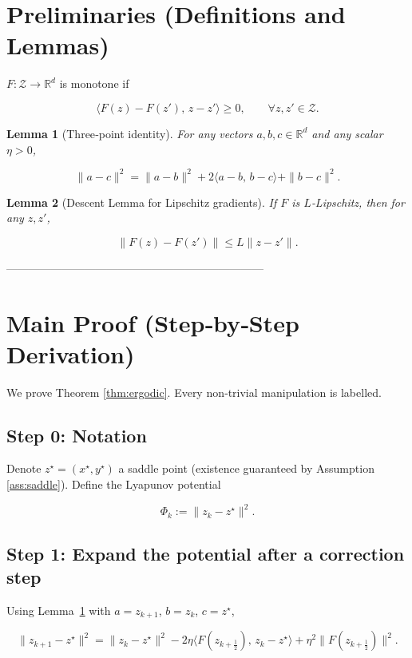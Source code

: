 \documentclass{article}
\newtheorem{lemma}{Lemma}
\newcommand{\RR}{\mathbb{R}}
\begin{document}
\section*{Preliminaries (Definitions and Lemmas)}
\begin{definition}
$F:\mathcal{Z}\to\RR^{d}$ is monotone if  

\[
\langle F(z)-F(z'),\,z-z'\rangle\ge0,\qquad\forall z,z'\in\mathcal{Z}.
\tag{D1}
\]
\end{definition}

\begin{lemma}[Three‑point identity]\label{lem:three}
For any vectors $a,b,c\in\RR^{d}$ and any scalar $\eta>0$,

\[
\|a-c\|^{2}= \|a-b\|^{2}+2\langle a-b,\,b-c\rangle+\|b-c\|^{2}.
\tag{L1}
\]
\end{lemma}

\begin{lemma}[Descent Lemma for Lipschitz gradients]\label{lem:descent}
If $F$ is $L$‑Lipschitz, then for any $z,z'$,

\[
\|F(z)-F(z')\| \le L\|z-z'\|.
\tag{L2}
\]
\end{lemma}

---------------------------------------------------------------------

\section*{Main Proof (Step‑by‑Step Derivation)}
We prove Theorem \ref{thm:ergodic}. Every non‑trivial manipulation is labelled.

\subsection*{Step 0: Notation}
Denote $z^{\star}=(x^{\star},y^{\star})$ a saddle point (existence guaranteed by Assumption \ref{ass:saddle}).  
Define the Lyapunov potential  

\[
\Phi_k:=\|z_k-z^{\star}\|^{2}.
\tag{P0}
\]

\subsection*{Step 1: Expand the potential after a correction step}
Using Lemma~\ref{lem:three} with $a=z_{k+1}$, $b=z_{k}$, $c=z^{\star}$,

\[
\|z_{k+1}-z^{\star}\|^{2}= \|z_k-z^{\star}\|^{2}
-2\eta\langle F(z_{k+\frac12}),\,z_k-z^{\star}\rangle
+\eta^{2}\|F(z_{k+\frac12})\|^{2}.
\tag{S1}
\]
\end{document}
